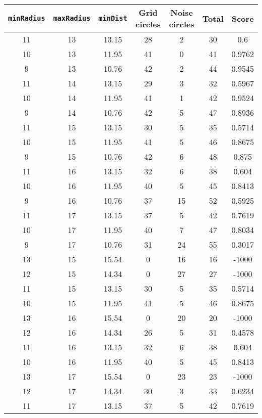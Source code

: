 \documentclass[letterpaper, 12pt]{article}
\begin{document}
\begin{longtable}{|c|c|c|c|c|c|c|}
\hline
\textbf{\texttt{minRadius}} & \textbf{\texttt{maxRadius}} & \textbf{\texttt{minDist}} & \textbf{Grid circles} & \textbf{Noise circles} & \textbf{Total} & \textbf{Score} \\
\hline
11 & 13 & 13.15 & 28 & 2 & 30 & 0.6 \\
\hline
10 & 13 & 11.95 & 41 & 0 & 41 & 0.9762 \\
\hline
9 & 13 & 10.76 & 42 & 2 & 44 & 0.9545 \\
\hline
11 & 14 & 13.15 & 29 & 3 & 32 & 0.5967 \\
\hline
10 & 14 & 11.95 & 41 & 1 & 42 & 0.9524 \\
\hline
9 & 14 & 10.76 & 42 & 5 & 47 & 0.8936 \\
\hline
11 & 15 & 13.15 & 30 & 5 & 35 & 0.5714 \\
\hline
10 & 15 & 11.95 & 41 & 5 & 46 & 0.8675 \\
\hline
9 & 15 & 10.76 & 42 & 6 & 48 & 0.875 \\
\hline
11 & 16 & 13.15 & 32 & 6 & 38 & 0.604 \\
\hline
10 & 16 & 11.95 & 40 & 5 & 45 & 0.8413 \\
\hline
9 & 16 & 10.76 & 37 & 15 & 52 & 0.5925 \\
\hline
11 & 17 & 13.15 & 37 & 5 & 42 & 0.7619 \\
\hline
10 & 17 & 11.95 & 40 & 7 & 47 & 0.8034 \\
\hline
9 & 17 & 10.76 & 31 & 24 & 55 & 0.3017 \\
\hline
13 & 15 & 15.54 & 0 & 16 & 16 & -1000 \\
\hline
12 & 15 & 14.34 & 0 & 27 & 27 & -1000 \\
\hline
11 & 15 & 13.15 & 30 & 5 & 35 & 0.5714 \\
\hline
10 & 15 & 11.95 & 41 & 5 & 46 & 0.8675 \\
\hline
13 & 16 & 15.54 & 0 & 20 & 20 & -1000 \\
\hline
12 & 16 & 14.34 & 26 & 5 & 31 & 0.4578 \\
\hline
11 & 16 & 13.15 & 32 & 6 & 38 & 0.604 \\
\hline
10 & 16 & 11.95 & 40 & 5 & 45 & 0.8413 \\
\hline
13 & 17 & 15.54 & 0 & 23 & 23 & -1000 \\
\hline
12 & 17 & 14.34 & 30 & 3 & 33 & 0.6234 \\
\hline
11 & 17 & 13.15 & 37 & 5 & 42 & 0.7619 \\
\hline

\end{longtable}
\end{document}
